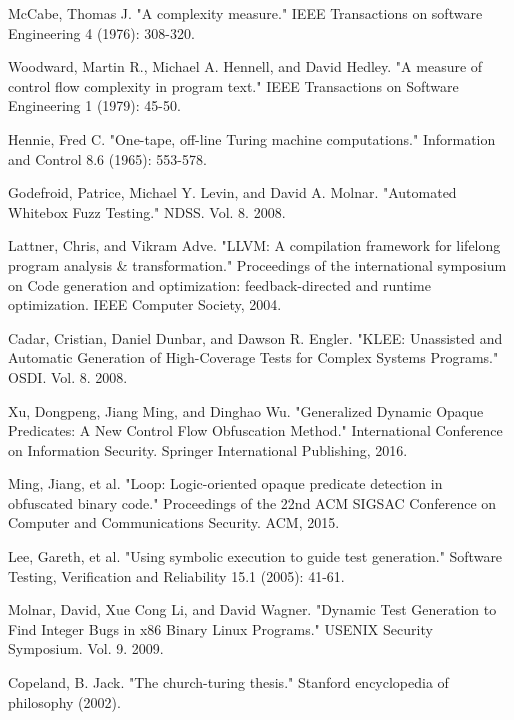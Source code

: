 \documentclass[lnicst]{svmultln}
\begin{document}
\begin{thebibliography}{5}
 McCabe, Thomas J. "A complexity measure." IEEE Transactions on software Engineering 4 (1976): 308-320.

 Woodward, Martin R., Michael A. Hennell, and David Hedley. "A measure of control flow complexity in program text." IEEE Transactions on Software Engineering 1 (1979): 45-50.

 Hennie, Fred C. "One-tape, off-line Turing machine computations." Information and Control 8.6 (1965): 553-578.

 Godefroid, Patrice, Michael Y. Levin, and David A. Molnar. "Automated Whitebox Fuzz Testing." NDSS. Vol. 8. 2008.


 Lattner, Chris, and Vikram Adve. "LLVM: A compilation framework for lifelong program analysis \& transformation." Proceedings of the international symposium on Code generation and optimization: feedback-directed and runtime optimization. IEEE Computer Society, 2004.

 Cadar, Cristian, Daniel Dunbar, and Dawson R. Engler. "KLEE: Unassisted and Automatic Generation of High-Coverage Tests for Complex Systems Programs." OSDI. Vol. 8. 2008.

 Xu, Dongpeng, Jiang Ming, and Dinghao Wu. "Generalized Dynamic Opaque Predicates: A New Control Flow Obfuscation Method." International Conference on Information Security. Springer International Publishing, 2016.

 Ming, Jiang, et al. "Loop: Logic-oriented opaque predicate detection in obfuscated binary code." Proceedings of the 22nd ACM SIGSAC Conference on Computer and Communications Security. ACM, 2015.

 Lee, Gareth, et al. "Using symbolic execution to guide test generation." Software Testing, Verification and Reliability 15.1 (2005): 41-61.

 Molnar, David, Xue Cong Li, and David Wagner. "Dynamic Test Generation to Find Integer Bugs in x86 Binary Linux Programs." USENIX Security Symposium. Vol. 9. 2009.

 Copeland, B. Jack. "The church-turing thesis." Stanford encyclopedia of philosophy (2002).




\end{thebibliography}
\end{document}
